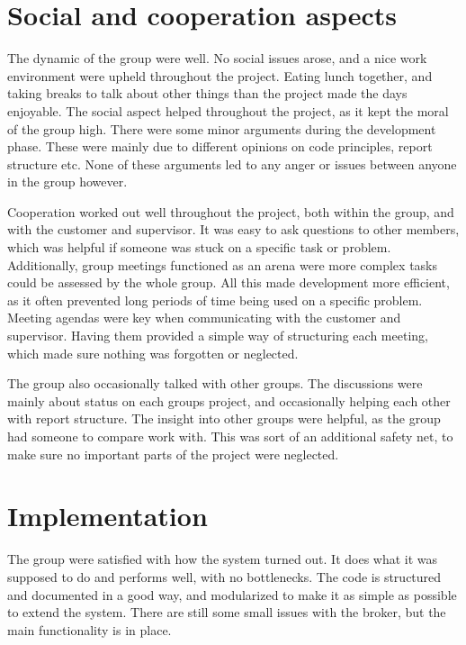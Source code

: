 \section{Social and cooperation aspects}
\label{sec:Social_and_cooperation_aspects}

The dynamic of the group were well. No social issues arose, and a nice work environment were upheld throughout the project. Eating lunch together, and taking breaks to talk about other things than the project made the days enjoyable. The social aspect helped throughout the project, as it kept the moral of the group high. There were some minor arguments during the development phase. These were mainly due to different opinions on code principles, report structure etc. None of these arguments led to any anger or issues between anyone in the group however.

Cooperation worked out well throughout the project, both within the group, and with the customer and supervisor. It was easy to ask questions to other members, which was helpful if someone was stuck on a specific task or problem. Additionally, group meetings functioned as an arena were more complex tasks could be assessed by the whole group. All this made development more efficient, as it often prevented long periods of time being used on a specific problem. Meeting agendas were key when communicating with the customer and supervisor. Having them provided a simple way of structuring each meeting, which made sure nothing was forgotten or neglected.

The group also occasionally talked with other groups. The discussions were mainly about status on each groups project, and occasionally helping each other with report structure. The insight into other groups were helpful, as the group had someone to compare work with. This was sort of an additional safety net, to make sure no important parts of the project were neglected.

\section{Implementation}
\label{sec:Implementation}

The group were satisfied with how the system turned out. It does what it was supposed to do and performs well, with no bottlenecks. The code is structured and documented in a good way, and modularized to make it as simple as possible to extend the system. There are still some small issues with the broker, but the main functionality is in place. 

